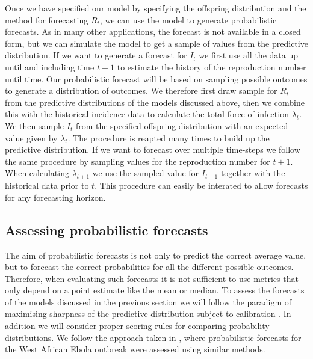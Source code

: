 \documentclass[12pt]{article}
\begin{document}
Once we have specified our model by specifying the offspring distribution and the method for forecasting $R_t$, we can use the model to generate probabilistic forecasts. As in many other applications, the forecast is not available in a closed form, but we can simulate the model to get a sample of values from the predictive distribution. If we want to generate a forecast for $I_{t}$ we first use all the data up until and including time $t-1$ to estimate the history of the reproduction number until time. Our probabilistic forecast will be based on sampling possible outcomes to generate a distribution of outcomes. We therefore first draw sample for $R_{t}$ from the predictive distributions of the models discussed above, then we combine this with the historical incidence data to calculate the total force of infection $\lambda_{t}$. We then sample $I_{t}$ from the specified offspring distribution with an expected value given by $\lambda_{t}$. The procedure is reapted many times to build up the predictive distribution. If we want to forecast over multiple time-steps we follow the same procedure by sampling values for the reproduction number for $t+1$. When calculating $\lambda_{t+1}$ we use the sampled value for $I_{t+1}$ together with the historical data prior to $t$. This procedure can easily be interated to allow forecasts for any forecasting horizon.


\subsection{Assessing probabilistic forecasts}

The aim of probabilistic forecasts is not only to predict the correct average value, but to forecast the correct probabilities for all the different possible outcomes. Therefore, when evaluating such forecasts it is not sufficient to use metrics that only depend on a point estimate like the mean or median. To assess the forecasts of the models discussed in the previous section we will follow the paradigm of maximising sharpness of the predictive distribution subject to calibration \cite{gneitingProbabilisticForecastsCalibration2007}. In addition we will consider proper scoring rules for comparing probability distributions. We follow the approach taken in \cite{funkAssessingPerformanceRealtime2019}, where probabilistic forecasts for the West African Ebola outbreak were assessed using similar methods.
\end{document}
